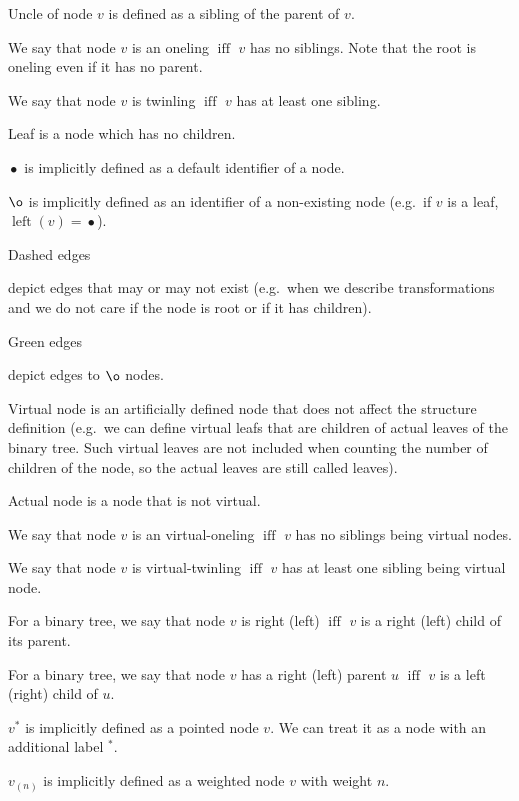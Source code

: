 \documentclass[final]{article}
\theoremstyle{definition}
\theoremstyle{remark}
\newcommand{\pointed}[1]{\ensuremath{{#1}^*}}
\newcommand{\weighted}[1]{\ensuremath{_{(#1)}}}
\DeclareMathOperator{\textiff}{\text{iff}}
\DeclareMathOperator{\tleft}{\text{left}}
\DeclareMathOperator{\n}{\bullet}
\DeclareMathOperator{\no}{\o}
\begin{document}
Uncle of node \(v\) is defined as a sibling of the parent of \(v\).

We say that node \(v\) is an oneling \(\textiff\) \(v\) has no siblings. Note that the root is oneling even if it has no parent.

We say that node \(v\) is twinling \(\textiff\) \(v\) has at least one sibling.

Leaf is a node which has no children.

\(\n\) is implicitly defined as a default identifier of a node.

\(\no\) is implicitly defined as an identifier of a non-existing node (e.g.\ if \(v\) is a leaf, \(\tleft(v) = \n\)).

Dashed edges 
\begin{minipage}{1.5em}

\end{minipage}
depict edges that may or may not exist (e.g.\ when we describe transformations and we do not care if the node is root or if it has children).

Green edges 
\begin{minipage}{1.5em}

\end{minipage}
depict edges to \(\no\) nodes.

Virtual node is an artificially defined node that does not affect the structure definition (e.g.\ we can define virtual leafs that are children of actual leaves of the binary tree. Such virtual leaves are not included when counting the number of children of the node, so the actual leaves are still called leaves).

Actual node is a node that is not virtual.

We say that node \(v\) is an virtual-oneling \(\textiff\) \(v\) has no siblings being virtual nodes.

We say that node \(v\) is virtual-twinling \(\textiff\) \(v\) has at least one sibling being virtual node.

For a binary tree, we say that node \(v\) is right (left) \(\textiff\) \(v\) is a right (left) child of its parent.

For a binary tree, we say that node \(v\) has a right (left) parent \(u\) \(\textiff\) \(v\) is a left (right) child of \(u\).

\(\pointed{v}\) is implicitly defined as a pointed node \(v\). We can treat it as a node with an additional label \(\pointed{}\).

\(v\weighted{n}\) is implicitly defined as a weighted node \(v\) with weight \(n\).
\end{document}
